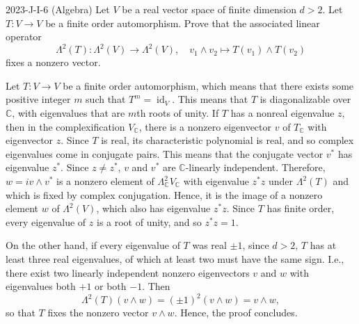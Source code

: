 \documentclass{article}
\begin{document}
\begin{prb}{2023-J-I-6 (Algebra)}
	Let $V$ be a real vector space of finite dimension $d > 2$. Let $T: V \to V$ be a finite order automorphism. Prove that the associated linear operator 
		\begin{equation*}
			\Lambda^{2}(T): \Lambda^{2}(V) \to \Lambda^{2}(V), \quad v_{1} \wedge v_{2} \mapsto T(v_{1}) \wedge T(v_{2})
		\end{equation*}
	fixes a nonzero vector. 
\end{prb}
\begin{solutions}
	Let $T: V \to V$ be a finite order automorphism, which means that there exists some positive integer $m$ such that $T^{m} = \operatorname{id}_{V}$. This means that $T$ is diagonalizable over $\mathbb{C}$, with eigenvalues that are $m$th roots of unity. If $T$ has a nonreal eigenvalue $z$, then in the complexification $V_{\mathbb{C}}$, there is a nonzero eigenvector $v$ of $T_{\mathbb{C}}$ with eigenvector $z$. Since $T$ is real, its characteristic polynomial is real, and so complex eigenvalues come in conjugate pairs. This means that the conjugate vector $v^{\ast}$ has eigenvalue $z^{\ast}$. Since $z \neq z^{\ast}$, $v$ and $v^{\ast}$ are $\mathbb{C}$-linearly independent. Therefore, $w = iv\wedge v^{\ast}$ is a nonzero element of $\Lambda^{2}_{\mathbb{C}}V_{\mathbb{C}}$ with eigenvalue $z^{\ast}z$ under $\Lambda^{2}(T)$ and which is fixed by complex conjugation. Hence, it is the image of a nonzero element $w$ of $\Lambda^{2}(V)$, which also has eigenvalue $z^{\ast}z$. Since $T$ has finite order, every eigenvalue of $z$ is a root of unity, and so $z^{\ast}z = 1$. 
	
	On the other hand, if every eigenvalue of $T$ was real $\pm 1$, since $d > 2$, $T$ has at least three real eigenvalues, of which at least two must have the same sign. I.e., there exist two linearly independent nonzero eigenvectors $v$ and $w$ with eigenvalues both $+ 1$ or both $-1$. Then 
		\begin{equation}
			\Lambda^{2}(T)(v \wedge w) = (\pm 1)^{2}(v \wedge w) = v \wedge w, 
		\end{equation}
	so that $T$ fixes the nonzero vector $v \wedge w$. Hence, the proof concludes.
\end{solutions}
\end{document}
